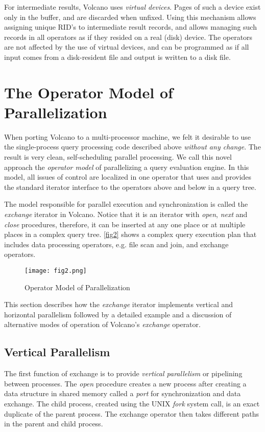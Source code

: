 \documentclass[a4paper,12pt,notitlepage,twoside,openright]{article}
\begin{document}
For intermediate results, Volcano uses \emph{virtual devices}.
Pages of such a device exist only in the buffer, and are
discarded when unfixed. Using this mechanism allows
assigning unique RID's to intermediate result records, and
allows managing such records in all operators as if they
resided on a real (disk) device. The operators are not
affected by the use of virtual devices, and can be programmed
as if all input comes from a disk-resident file and
output is written to a disk file.

\section{The Operator Model of Parallelization}

When porting Volcano to a multi-processor machine,
we felt it desirable to use the single-process query processing
code described above \emph{without any change}. The result is
very clean, self-scheduling parallel processing. We call this
novel approach the \emph{operator model} of parallelizing a query
evaluation engine. In this model, all issues of control are
localized in one operator that uses and provides the standard
iterator interface to the operators above and below in a
query tree.

The model responsible for parallel execution and
synchronization is called the \emph{exchange} iterator in Volcano.
Notice that it is an iterator with \emph{open}, \emph{next} and \emph{close}
procedures, therefore, it can be inserted at any one place or at
multiple places in a complex query tree. \autoref{fig2} shows a
complex query execution plan that includes data processing
operators, e.g. file scan and join, and exchange operators.

\begin{figure}
  \centering
  \texttt{[image: fig2.png]}
  \caption{Operator Model of Parallelization\label{fig2}}
\end{figure}

This section describes how the \emph{exchange} iterator
implements vertical and horizontal parallelism followed by a
detailed example and a discussion of alternative modes of
operation of Volcano's \emph{exchange} operator.

\subsection{Vertical Parallelism}

The first function of exchange is to provide \emph{vertical
parallelism} or pipelining between processes. The \emph{open}
procedure creates a new process after creating a data structure
in shared memory called a \emph{port} for synchronization and data
exchange. The child process, created using the UNIX \emph{fork}
system call, is an exact duplicate of the parent process.
The exchange operator then takes different paths in the
parent and child process.
\end{document}
